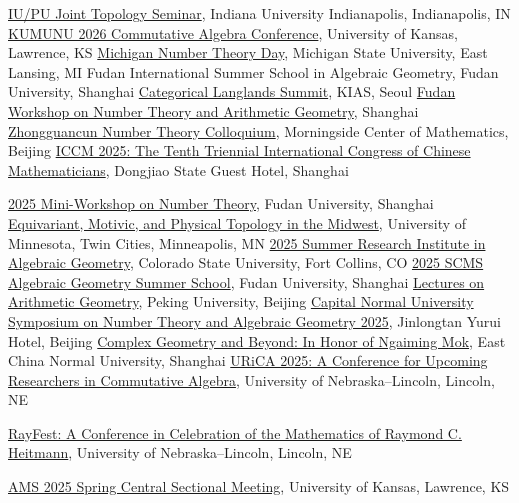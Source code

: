 \documentclass[11pt,letterpaper,sans]{moderncv}
\begin{document}
\cvitem{\textcolor{color1}{2026}}{}
  {\href{https://topology.math.indiana.edu/?historical=AY2026}{IU/PU Joint Topology Seminar}, Indiana University Indianapolis, Indianapolis, IN}
  {\href{https://kumunualg2026.ku.edu/}{KUMUNU 2026 Commutative Algebra Conference}, University of Kansas, Lawrence, KS}
  {\href{https://sites.google.com/msu.edu/prestonwake/mntd-fs-2026}{Michigan Number Theory Day}, Michigan State University, East Lansing, MI}
  {Fudan International Summer School in Algebraic Geometry, Fudan University, Shanghai}
  {\href{http://www.davidrenshawhansen.net/2026KIASsummerschool.html}{Categorical Langlands Summit}, KIAS, Seoul}
  {\href{https://www.fudan-nt.cn/events/2026-06-06-workshop.html}{Fudan Workshop on Number Theory and Arithmetic Geometry}, Shanghai}
  {\href{https://ymsc.tsinghua.edu.cn/info/1060/3911.htm}{Zhongguancun Number Theory Colloquium}, Morningside Center of Mathematics, Beijing}
  {\href{https://iccm.simis.cn/iccm2025/}{ICCM 2025: The Tenth Triennial International Congress of Chinese Mathematicians}, Dongjiao State Guest Hotel, Shanghai}

\cvitem{\textcolor{color1}{2025}}{}
  {\href{https://scms.fudan.edu.cn/info/5743/11611.htm}{2025 Mini-Workshop on Number Theory}, Fudan University, Shanghai}
  {\href{https://cse.umn.edu/math/events/equivariant-motivic-and-physical-topology-midwest}{Equivariant, Motivic, and Physical Topology in the Midwest}, University of Minnesota, Twin Cities, Minneapolis, MN}
  {\href{https://sites.google.com/view/2025summerinstitute/}{2025 Summer Research Institute in Algebraic Geometry}, Colorado State University, Fort Collins, CO}
  {\href{https://scms.fudan.edu.cn/info/5753/9971.htm}{2025 SCMS Algebraic Geometry Summer School}, Fudan University, Shanghai}
  {\href{https://www.math.pku.edu.cn/kxyj/xzky/168194.htm}{Lectures on Arithmetic Geometry}, Peking University, Beijing}
  {\href{https://ams.cnu.edu.cn/xxzx/xsrl/87ed1e213aa4497596844b5b2feebdd0.htm}{Capital Normal University Symposium on Number Theory and Algebraic Geometry 2025}, Jinlongtan Yurui Hotel, Beijing}
  {\href{https://math.ecnu.edu.cn/~scng/conference/mok_conference.html}{Complex Geometry and Beyond: In Honor of Ngaiming Mok}, East China Normal University, Shanghai}
  {\href{https://urica-unl.github.io/index.html}{URiCA 2025: A Conference for Upcoming Researchers in Commutative Algebra}, University of Nebraska--Lincoln, Lincoln, NE}
  {\raggedright{}\href{https://sites.google.com/view/rayfest}{RayFest: A Conference in Celebration of the Mathematics of Raymond C. Heitmann}, University of Nebraska--Lincoln, Lincoln, NE}
  {\href{https://www.ams.org/meetings/sectional/2321_deadlines.html}{AMS 2025 Spring Central Sectional Meeting}, University of Kansas, Lawrence, KS}
\end{document}
